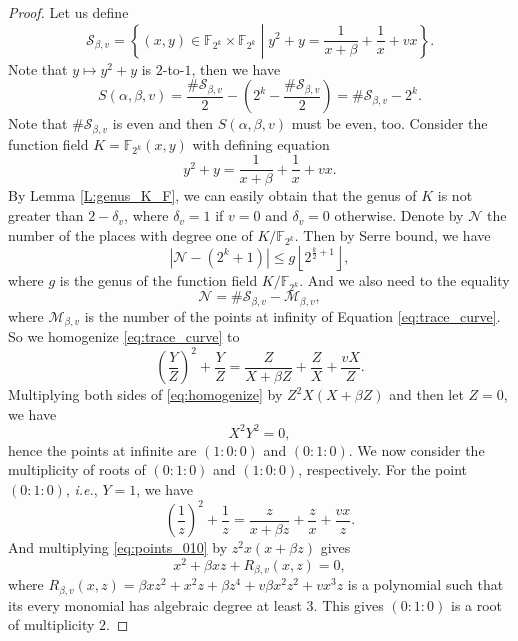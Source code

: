 \documentclass{article}
\newcommand{\F}{\mathbb{F}}
\newcommand{\0}{\textbf{0}}
\newcommand{\1}{\textbf{1}}
\theoremstyle{plain}
\begin{document}
\begin{proof}
        Let us define 
        \[\mathcal{S}_{\beta,v}=\left\{(x,y)\in\F_{2^k}\times\F_{2^k}\middle|y^2+y=\frac{1}{x+\beta}+\frac{1}{x}+vx\right\}.\]
        Note that $y\mapsto y^2+y$ is $2$-to-$1$, then we have 
        \begin{equation}\label{eq:tracesum_S}
            S(\alpha,\beta,v)=\frac{\#\mathcal{S}_{\beta,v}}{2}-\left(2^k-\frac{\#\mathcal{S}_{\beta,v}}{2}\right)=\#\mathcal{S}_{\beta,v}-2^k.
        \end{equation}
        Note that $\#\mathcal{S}_{\beta,v}$ is even and then $S(\alpha,\beta,v)$ must be even, too. 
        Consider the function field $K=\F_{2^k}(x,y)$ with defining equation 
        \begin{equation}\label{eq:trace_curve}
            y^2+y=\frac{1}{x+\beta}+\frac{1}{x}+vx.
        \end{equation}
        By Lemma \ref{L:genus_K_F}, we can easily obtain that the genus of $K$ is not greater than $2-\delta_v$, 
        where $\delta_v=1$ if $v=0$ and $\delta_v=0$ otherwise. 
        Denote by $\mathcal{N}$ the number of the places with degree one of $K/\F_{2^k}$. 
        Then by Serre bound\cite{Serre1982serrebound}, we have 
        \begin{equation}\label{eq:N_genus_inequality}
            \left\lvert \mathcal{N}-(2^k+1)\right\rvert\le g\left\lfloor 2^{\frac{k}{2}+1}\right\rfloor,
        \end{equation}
        where $g$ is the genus of the function field $K/\F_{2^k}$. 
        And we also need to the equality 
        \begin{equation}\label{eq:N_S_M_equality}
            \mathcal{N}=\#\mathcal{S}_{\beta,v}-\mathcal{M}_{\beta,v},
        \end{equation}
        where $\mathcal{M}_{\beta,v}$ is the number of the points at infinity of Equation \eqref{eq:trace_curve}. 
        So we homogenize \eqref{eq:trace_curve} to 
        \begin{equation}\label{eq:homogenize}
            \left( \frac{Y}{Z} \right)^2+\frac{Y}{Z}=\frac{Z}{X+\beta Z}+\frac{Z}{X}+\frac{vX}{Z}.
        \end{equation}
        Multiplying both sides of \eqref{eq:homogenize} by $Z^2X\left( X+\beta Z \right)$ and then let $Z=0$, 
        we have 
        \[X^2Y^2=0,\]
        hence the points at infinite are $(1:0:0)$ and $(0:1:0)$. 
        We now consider the multiplicity of roots of $(0 : 1 : 0)$ and $(1 : 0 : 0)$, respectively. 
        For the point $(0 : 1 : 0 )$, \emph{i.e.}, $Y = 1$, we have
        \begin{equation}\label{eq:points_010}
            \left( \frac{1}{z} \right)^2+\frac{1}{z}=\frac{z}{x+\beta z}+\frac{z}{x}+\frac{vx}{z}.
        \end{equation}
        And multiplying \eqref{eq:points_010} by $z^2x(x+\beta z)$ gives 
        \[x^2+\beta xz+R_{\beta,v}(x,z)=0,\]
        where $R_{\beta,v}(x,z)=\beta xz^2+x^2z+\beta z^4+v\beta x^2z^2+vx^3z$ is a polynomial 
        such that its every monomial has algebraic degree at least $3$. 
        This gives $(0 : 1 : 0)$ is a root of multiplicity $2$. 
        

\end{proof}
\end{document}
